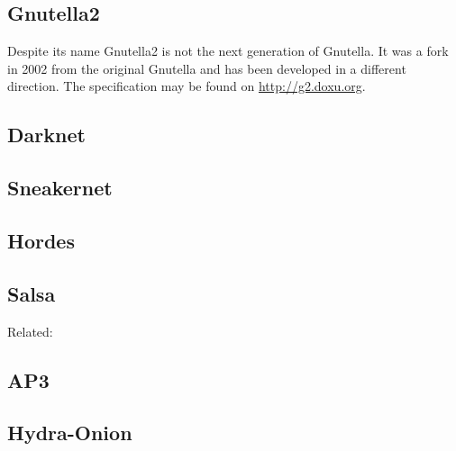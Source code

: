 
\subsection{Gnutella2}
Despite its name Gnutella2 is not the next generation of Gnutella. It was a fork in 2002 from the original Gnutella and has been developed in a different direction. The specification may be found on \href{http://g2.doxu.org}{http://g2.doxu.org}.


\subsection{Darknet}


\subsection{Sneakernet}


\subsection{Hordes}
\cite{Levine:2002}


\subsection{Salsa}
\cite{Salsa}

Related: \cite{ccs2008:mittal}


\subsection{AP3}

\cite{mislove2004ap3}


\subsection{Hydra-Onion}
\cite{iwanik2005duo}


